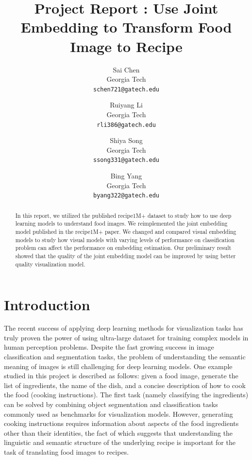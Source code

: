 \documentclass[10pt,twocolumn,letterpaper]{article}
\begin{document}
\title{Project Report : Use Joint Embedding to Transform Food Image to Recipe}

\author{Sai Chen\\
Georgia Tech\\
{\tt\small schen721@gatech.edu}
\and
Ruiyang Li\\
Georgia Tech\\
{\tt\small rli386@gatech.edu}
\and
Shiya Song\\
Georgia Tech\\
{\tt\small ssong331@gatech.edu}
\and
Bing Yang\\
Georgia Tech\\
{\tt\small byang322@gatech.edu}
}

\maketitle

\begin{abstract}
   In this report, we utilized the published recipe1M+ dataset to study how to use deep learning models to understand food images.  We reimplemented the joint embedding model published in the recipe1M+ paper.  We changed and compared visual embedding models to study how visual models with varying levels of performance on classification problem can affect the performance on embedding estimation.  Our preliminary result showed that the quality of the joint embedding model can be improved by using better quality visualization model.
\end{abstract}

\section{Introduction}

The recent success of applying deep learning methods for visualization tasks has truly proven the power of using ultra-large dataset for training complex models in human perception problems.  Despite the fast growing success in image classification and segmentation tasks, the problem of understanding the semantic meaning of images is still challenging for deep learning models.  One example studied in this project is described as follows: given a food image, generate the list of ingredients, the name of the dish, and a concise description of how to cook the food (cooking instructions).  The first task (namely classifying the ingredients) can be solved by combining object segmentation and classification tasks commonly used as benchmarks for visualization models.  However, generating cooking instructions requires information about aspects of the food ingredients other than their identities, the fact of which suggests that understanding the linguistic and semantic structure of the underlying recipe is important for the task of translating food images to recipes.
\end{document}
